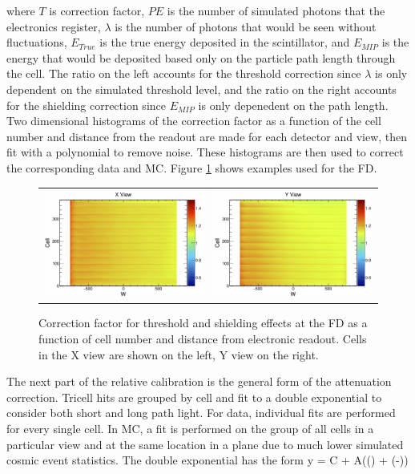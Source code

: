 \n where $T$ is correction factor, $PE$ is the number of simulated photons that the electronics register, $\lambda$ is the number of photons that would be seen without fluctuations, $E_{True}$ is the true energy deposited in the scintillator, and $E_{MIP}$ is the energy that would be deposited based only on the particle path length through the cell. The ratio on the left accounts for the threshold correction since $\lambda$ is only dependent on the simulated threshold level, and the ratio on the right accounts for the shielding correction since $E_{MIP}$ is only depenedent on the path length. Two dimensional histograms of the correction factor as a function of the cell number and distance from the readout are made for each detector and view, then fit with a polynomial to remove noise. These histograms are then used to correct the corresponding data and MC. Figure \ref{fig:CalibThreshold} shows examples used for the FD.
\begin{figure}[htb]
  \centering
  \begin{tabular}{c c}
    \includegraphics[width=.47\textwidth]{figures/Calib/ThresholdFDX.png} &
    \includegraphics[width=.47\textwidth]{figures/Calib/ThresholdFDY.png} \\
  \end{tabular}
  \caption[Threshold and Shielding Correction Factors]{Correction factor for threshold and shielding effects at the FD as a function of cell number and distance from electronic readout. Cells in the X view are shown on the left, Y view on the right.}
  \label{fig:CalibThreshold}
\end{figure}

The next part of the relative calibration is the general form of the attenuation correction. Tricell hits are grouped by cell and fit to a double exponential to consider both short and long path light. For data, individual fits are performed for every single cell. In MC, a fit is performed on the group of all cells in a particular view and at the same location in a plane due to much lower simulated cosmic event statistics. The double exponential has the form
\beq
y = C + A\left(\exp\left(\right) + \exp\left(-\right)\right)
\label{eq:CalibAttenuation}
\eeq

